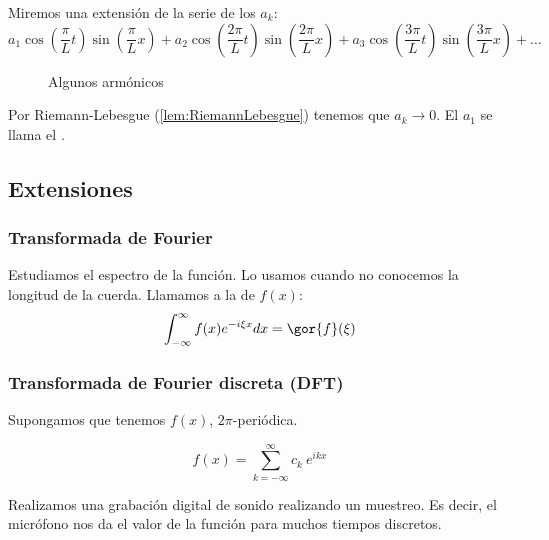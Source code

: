 			Miremos una extensión de la serie de los $a_k$:
			\[a_1 \cos\left(\frac{\pi}{L}t \right) \sin\left(\frac{\pi}{L}x \right) + a_2 \cos\left(\frac{2\pi}{L}t \right) \sin\left(\frac{2\pi}{L}x \right) + a_3 \cos\left(\frac{3\pi}{L}t \right) \sin\left(\frac{3\pi}{L}x \right) + …\]


			\begin{figure}[hbtp]
				\begin{minipage}[m]{.33\linewidth}
				\end{minipage}
				\begin{minipage}[m]{.33\linewidth}
				\end{minipage}
				\begin{minipage}[m]{.33\linewidth}
				\end{minipage}
				\caption{Algunos armónicos}
				\label{fig:ondas-armonicos}
			\end{figure}


			Por Riemann-Lebesgue (\ref{lem:RiemannLebesgue}) tenemos que $a_k \to 0$.
			\obs El $a_1$ se llama el .

	\subsection{Extensiones}

		\subsubsection{Transformada de Fourier}
			Estudiamos el espectro de la función. Lo usamos cuando no conocemos la longitud de la cuerda. Llamamos a la  de $f(x)$:
					\[\int_{-\infty}^\infty f(x) e^{-i \xi x} dx = \gor{f} (\xi) \]

		\subsubsection{Transformada de Fourier discreta (DFT)}

			Supongamos que tenemos $f(x)$, $2\pi$-periódica.

			\[ f(x) = \sum_{k=-\infty}^\infty c_k\ e^{ikx}\]

			Realizamos una grabación digital de sonido realizando un muestreo. Es decir, el micrófono nos da el valor de la función para muchos tiempos discretos.

